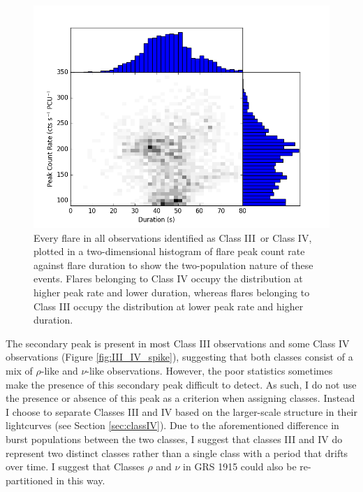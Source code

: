 \begin{figure}
    \includegraphics[width=\columnwidth, trim = 0mm 0mm 0mm 0mm]{images/GJBurst.png}
    \captionsetup{singlelinecheck=off}
    \caption[Every flare in all observations identified as Class III or Class IV, plotted in a two-dimensional histogram of flare peak count rate against flare duration to show the two-population nature of these events.]{Every flare in all observations identified as Class III\indexiii\ or Class IV\indexiv, plotted in a two-dimensional histogram of flare peak count rate against flare duration to show the two-population nature of these events.  Flares belonging to Class IV occupy the distribution at higher peak rate and lower duration, whereas flares belonging to Class III occupy the distribution at lower peak rate and higher duration.}
   \label{fig:III_IV_burst}
\end{figure}

\par The secondary peak is present in most Class III observations and some Class IV observations (Figure \ref{fig:III_IV_spike}), suggesting that both classes consist of a mix of $\rho$-like and $\nu$-like observations.  However, the poor statistics sometimes make the presence of this secondary peak difficult to detect.  As such, I do not use the presence or absence of this peak as a criterion when assigning classes.  Instead I choose to separate Classes III and IV based on the larger-scale structure in their lightcurves (see Section \ref{sec:classIV}).  Due to the aforementioned difference in burst populations between the two classes, I suggest that classes III and IV do represent two distinct classes rather than a single class with a period that drifts over time.  I suggest that Classes $\rho$ and $\nu$ in GRS 1915 could also be re-partitioned in this way.

